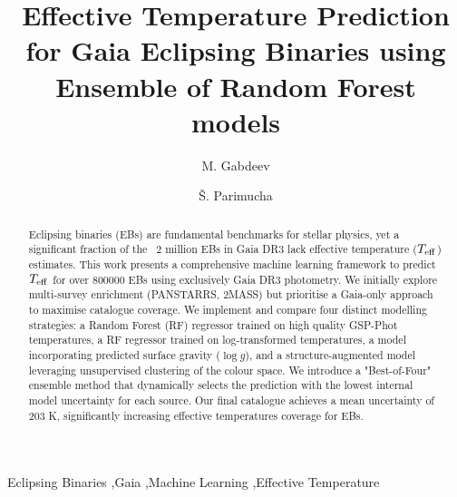 \documentclass[preprint,12pt,authoryear]{elsarticle}
\begin{document}
\begin{frontmatter}



\title{Effective Temperature Prediction for Gaia Eclipsing Binaries using Ensemble of Random Forest models}

\author[upjs]{M. Gabdeev}
\author[upjs]{\v{S}. Parimucha}



\begin{abstract}
Eclipsing binaries (EBs) are fundamental benchmarks for stellar physics, yet a significant fraction of the ~2 million EBs in Gaia DR3 lack effective temperature ($T_{\rm eff}$) estimates. 
This work presents a comprehensive machine learning framework to predict $T_{\rm eff}$ for over 800000 EBs using exclusively Gaia DR3 photometry. 
We initially explore multi-survey enrichment (PANSTARRS, 2MASS) but prioritise a Gaia-only approach to maximise catalogue coverage.
We implement and compare four distinct modelling strategies: 
a Random Forest (RF) regressor trained on high quality GSP-Phot temperatures, 
a RF regressor trained on log-transformed temperatures, 
a model incorporating predicted surface gravity ($\log g$), 
and a structure-augmented model leveraging unsupervised clustering of the colour space. 
We introduce a "Best-of-Four" ensemble method that dynamically selects the prediction with the lowest internal model uncertainty for each source. 
Our final catalogue achieves a mean uncertainty of 203 K, significantly increasing effective temperatures coverage for EBs.
\end{abstract}

\begin{keyword}
Eclipsing Binaries \sep Gaia \sep Machine Learning \sep Effective Temperature 
\end{keyword}

\end{frontmatter}
\end{document}
